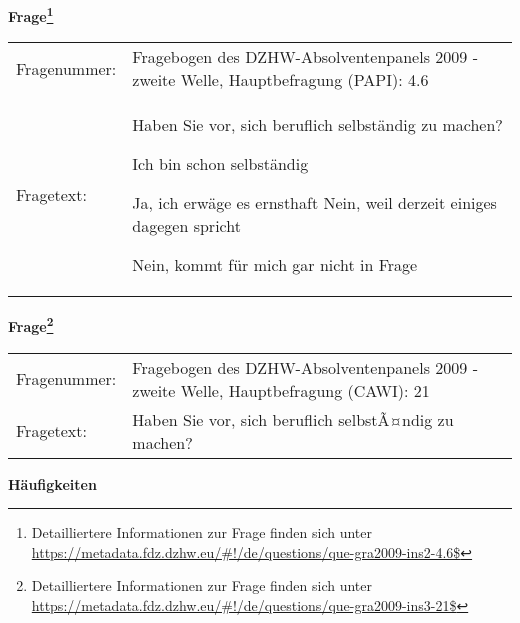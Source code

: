 				\vspace*{0.5cm}
                \noindent\textbf{Frage\footnote{Detailliertere Informationen zur Frage finden sich unter
		              \url{https://metadata.fdz.dzhw.eu/\#!/de/questions/que-gra2009-ins2-4.6$}}}\\
				\begin{tabularx}{\hsize}{@{}lX}
					Fragenummer: &
					  Fragebogen des DZHW-Absolventenpanels 2009 - zweite Welle, Hauptbefragung (PAPI):
					  4.6
 \\
					Fragetext: & Haben Sie vor, sich beruflich selbständig zu machen?\par  Ich bin schon selbständig\par  Ja, ich erwäge es ernsthaft Nein, weil derzeit einiges dagegen spricht\par  Nein, kommt für mich gar nicht in Frage \\
				\end{tabularx}
				\vspace*{0.5cm}
                \noindent\textbf{Frage\footnote{Detailliertere Informationen zur Frage finden sich unter
		              \url{https://metadata.fdz.dzhw.eu/\#!/de/questions/que-gra2009-ins3-21$}}}\\
				\begin{tabularx}{\hsize}{@{}lX}
					Fragenummer: &
					  Fragebogen des DZHW-Absolventenpanels 2009 - zweite Welle, Hauptbefragung (CAWI):
					  21
 \\
					Fragetext: & Haben Sie vor, sich beruflich selbstÃ¤ndig zu machen? \\
				\end{tabularx}





        		\vspace*{0.5cm}
                \noindent\textbf{Häufigkeiten}

